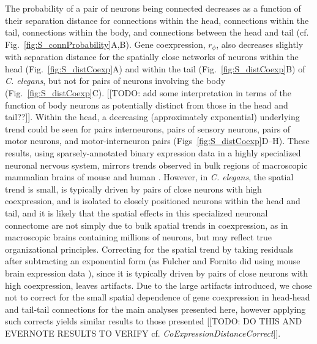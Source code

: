 \documentclass[10pt,letterpaper]{article}
\begin{document}
The probability of a pair of neurons being connected decreases as a function of their separation distance for connections within the head, connections within the tail, connections within the body, and connections between the head and tail (cf. Fig.~\ref{fig:S_connProbability}A,B).
Gene coexpression, $r_\phi$, also decreases slightly with separation distance for the spatially close networks of neurons within the head (Fig.~\ref{fig:S_distCoexp}A) and within the tail (Fig.~\ref{fig:S_distCoexp}B) of \emph{C. elegans}, but not for pairs of neurons involving the body (Fig.~\ref{fig:S_distCoexp}C).
[[TODO: add some interpretation in terms of the function of body neurons as potentially distinct from those in the head and tail??]].
Within the head, a decreasing (approximately exponential) underlying trend could be seen for pairs interneurons, pairs of sensory neurons, pairs of motor neurons, and motor-interneuron pairs (Figs~\ref{fig:S_distCoexp}D--H).
These results, using sparsely-annotated binary expression data in a highly specialized neuronal nervous system, mirrors trends observed in bulk regions of macroscopic mammalian brains of mouse \cite{Fulcher:2016ck} and human \cite{Krienen:2016eq}.
However, in \emph{C. elegans}, the spatial trend is small, is typically driven by pairs of close neurons with high coexpression, and is isolated to closely positioned neurons within the head and tail, and it is likely that the spatial effects in this specialized neuronal connectome are not simply due to bulk spatial trends in coexpression, as in macroscopic brains containing millions of neurons, but may reflect true organizational principles.
Correcting for the spatial trend by taking residuals after subtracting an exponential form (as Fulcher and Fornito did using mouse brain expression data \cite{Fulcher:2016ck}), since it is typically driven by pairs of close neurons with high coexpression, leaves artifacts.
Due to the large artifacts introduced, we chose not to correct for the small spatial dependence of gene coexpression in head-head and tail-tail connections for the main analyses presented here, however applying such corrects yields similar results to those presented [[TODO: DO THIS AND EVERNOTE RESULTS TO VERIFY cf. \emph{CoExpressionDistanceCorrect}]].
\end{document}
